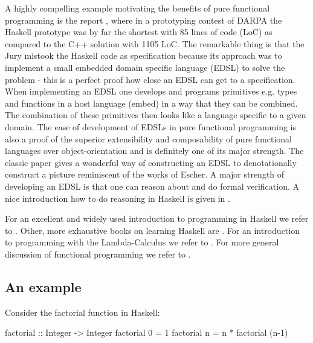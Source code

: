 A highly compelling example motivating the benefits of pure functional programming is the report \cite{hudak_haskell_1994}, where in a prototyping contest of DARPA the Haskell prototype was by far the shortest with 85 lines of code (LoC) as compared to the C++ solution with 1105 LoC. The remarkable thing is that the Jury mistook the Haskell code as specification because its approach was to implement a small embedded domain specific language (EDSL) to solve the problem - this is a perfect proof how close an EDSL can get to a specification. When implementing an EDSL one develops and programs primitives e.g. types and functions in a host language (embed) in a way that they can be combined. The combination of these primitives then looks like a language specific to a given domain. The ease of development of EDSLs in pure functional programming is also a proof of the superior extensibility and composability of pure functional languages over object-orientation and is definitely one of its major strength. The classic paper \cite{henderson_functional_1982} gives a wonderful way of constructing an EDSL to denotationally construct a picture reminiscent of the works of Escher. A major strength of developing an EDSL is that one can reason about and do formal verification. A nice introduction how to do reasoning in Haskell is given in \cite{hutton_tutorial_1999}.

For an excellent and widely used introduction to programming in Haskell we refer to \cite{hutton_programming_2016}. Other, more exhaustive books on learning Haskell are \cite{allen_haskell_2016, lipovaca_learn_2011}. For an introduction to programming with the Lambda-Calculus we refer to \cite{michaelson_introduction_2011}. For more general discussion of functional programming we refer to \cite{hudak_history_2007,hughes_why_1989,maclennan_functional_1990}.

\subsection{An example}
Consider the factorial function in Haskell:
\begin{HaskellCode}
factorial :: Integer -> Integer
factorial 0 = 1
factorial n = n * factorial (n-1)
\end{HaskellCode}

